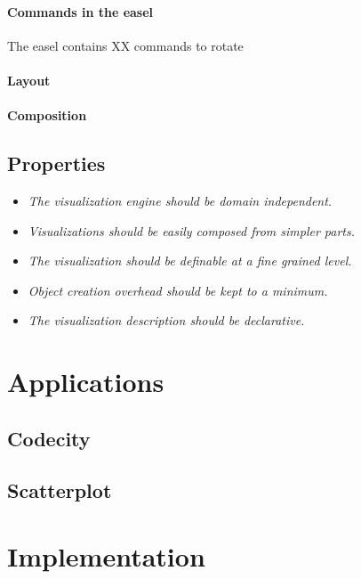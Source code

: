 \documentclass[runningheads]{llncs}
\newcommand{\seclabel}[1]{\label{sec:#1}}
\begin{document}
\paragraph{Commands in the easel} 
The easel contains XX commands to rotate 

\paragraph{Layout}

\paragraph{Composition}

\subsection{Properties} \seclabel{properties}

\begin{itemize}
\item \emph{The visualization engine should be domain independent.}
\item \emph{Visualizations should be easily composed from simpler parts.}
\item \emph{The visualization should be definable at a fine grained level.}
\item \emph{Object creation overhead should be kept to a minimum.}
\item \emph{The visualization description should be declarative.}
\end{itemize}

\section{Applications} \seclabel{applications}

\subsection{Codecity}

\subsection{Scatterplot}


\section{Implementation} \seclabel{implementation}
\end{document}
